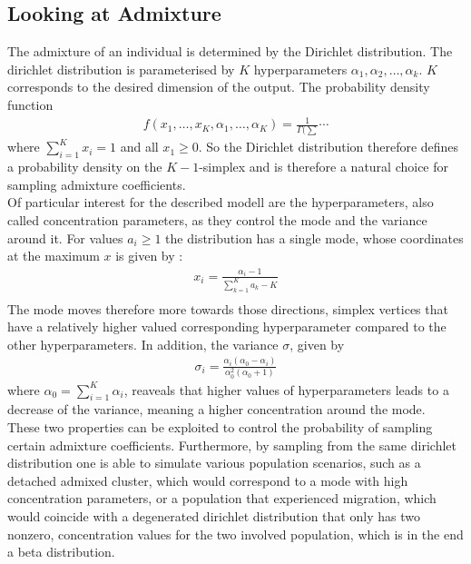 \documentclass[a4paper, 11pt]{article}
\begin{document}
\subsection{Looking at Admixture}
The admixture of an individual is determined by the Dirichlet distribution. The dirichlet distribution is parameterised by $K$ hyperparameters $\alpha_1,\alpha_2, \ldots, \alpha_k$. $K$ corresponds to the desired dimension of the output. The probability density function
\begin{align*}
f(x_1, \ldots, x_K, \alpha_1, \ldots, \alpha_K) = \frac{1}{\Gamma(\sum} \cdots
\end{align*}
where $\sum^{K}_{i =1} x_i = 1$ and all $x_1 \geq 0$. So the Dirichlet distribution therefore defines a probability density on the $K-1$-simplex and is therefore a natural choice for sampling admixture coefficients. \\
Of particular interest for the described modell are the hyperparameters, also called concentration parameters, as they control the mode and the variance around it. For values $a_i \geq 1$ the distribution has a single mode, whose coordinates at the maximum $x$ is given by \cite{bishop2006pattern}: 
\begin{align*}
x_i = \frac{\alpha_i - 1}{\sum^K_{k=1} a_k -K} \\
\end{align*}
The mode moves therefore more towards those directions, simplex vertices that have a relatively higher valued corresponding hyperparameter compared to the other hyperparameters. In addition, the variance $\sigma$, given by 
\begin{align*}
\sigma_i = \frac{\alpha_i(\alpha_0 - \alpha_i)}{\alpha_0^2(\alpha_0 + 1)}
\end{align*} 
where $\alpha_0 = \sum^{K}_{i = 1} \alpha_i$, reaveals that higher values of hyperparameters leads to a decrease of the variance, meaning a higher concentration around the mode. \\
These two properties can be exploited to control the probability of sampling certain admixture coefficients. Furthermore, by sampling from the same dirichlet distribution one is able to simulate various population scenarios, such as a detached admixed cluster, which would correspond to a mode with high concentration parameters, or a population that experienced migration, which would coincide with a degenerated dirichlet distribution that only has two nonzero, concentration values for the two involved population, which is in the end a beta distribution.
\end{document}
